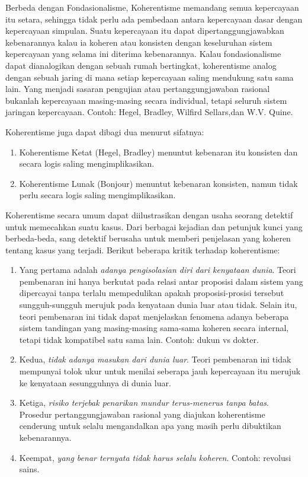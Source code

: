 \documentclass[11pt,twoside,a5paper,openany]{memoir}
\def\tightlist{}
\begin{document}
Berbeda dengan Fondasionalisme, Koherentisme memandang semua kepercayaan
itu setara, sehingga tidak perlu ada pembedaan antara kepercayaan dasar
dengan kepercayaan simpulan. Suatu kepercayaan itu dapat
dipertanggungjawabkan kebenarannya kalau ia koheren atau konsisten
dengan keseluruhan sistem kepercayaan yang selama ini diterima
kebenarannya. Kalau fondasionalisme dapat dianalogikan dengan sebuah
rumah bertingkat, koherentisme analog dengan sebuah jaring di mana
setiap kepercayaan saling mendukung satu sama lain. Yang menjadi sasaran
pengujian atau pertanggungjawaban rasional bukanlah kepercayaan
masing-masing secara individual, tetapi seluruh sistem jaringan
kepercayaan. Contoh: Hegel, Bradley, Wilfird Sellars,dan W.V. Quine.

Koherentisme juga dapat dibagi dua menurut sifatnya:

\begin{enumerate}
\def\labelenumi{\arabic{enumi}.}
\tightlist
\item
  Koherentisme Ketat (Hegel, Bradley) menuntut kebenaran itu konsisten
  dan secara logis saling mengimplikasikan.
\item
  Koherentisme Lunak (Bonjour) menuntut kebenaran konsisten, namun tidak
  perlu secara logis saling mengimplikasikan.
\end{enumerate}

Koherentisme secara umum dapat diilustrasikan dengan usaha seorang
detektif untuk memecahkan suatu kasus. Dari berbagai kejadian dan
petunjuk kunci yang berbeda-beda, sang detektif berusaha untuk memberi
penjelasan yang koheren tentang kasus yang terjadi. Berikut beberapa
kritik terhadap koherentisme:

\begin{enumerate}
\def\labelenumi{\arabic{enumi}.}
\tightlist
\item
  Yang pertama adalah \emph{adanya pengisolasian diri dari kenyataan
  dunia}. Teori pembenaran ini hanya berkutat pada relasi antar
  proposisi dalam sistem yang dipercayai tanpa terlalu mempedulikan
  apakah proposisi-prosisi tersebut sungguh-sungguh merujuk pada
  kenyataan dunia luar atau tidak. Selain itu, teori pembenaran ini
  tidak dapat menjelaskan fenomena adanya beberapa sistem tandingan yang
  masing-masing sama-sama koheren secara internal, tetapi tidak
  kompatibel satu sama lain. Contoh: dukun vs dokter.
\item
  Kedua, \emph{tidak adanya masukan dari dunia luar}. Teori pembenaran
  ini tidak mempunyai tolok ukur untuk menilai seberapa jauh kepercayaan
  itu merujuk ke kenyataan sesungguhnya di dunia luar.
\item
  Ketiga, \emph{risiko terjebak penarikan mundur terus-menerus tanpa
  batas}. Prosedur pertanggungjawaban rasional yang diajukan
  koherentisme cenderung untuk selalu mengandalkan apa yang masih perlu
  dibuktikan kebenarannya.
\item
  Keempat, \emph{yang benar ternyata tidak harus selalu koheren}.
  Contoh: revolusi sains.
\end{enumerate}
\end{document}
